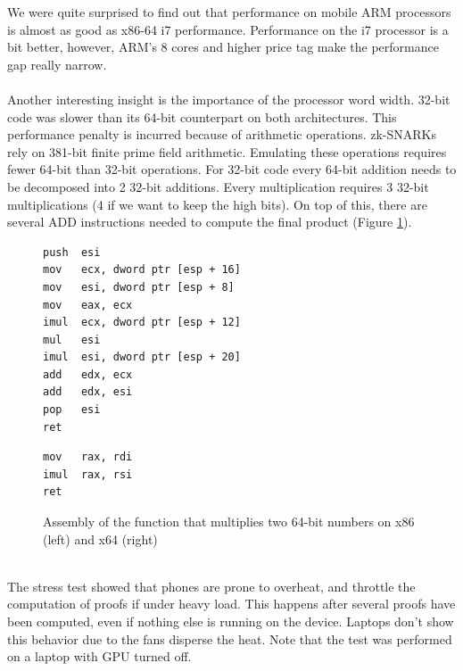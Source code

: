 We were quite surprised to find out that performance on mobile ARM processors is almost as good as x86-64 i7 performance. Performance on the i7 processor is a bit better, however, ARM's 8 cores and higher price tag make the performance gap really narrow.\\
\\
Another interesting insight is the importance of the processor word width. 32-bit code was slower than its 64-bit counterpart on both architectures. This performance penalty is incurred because of arithmetic operations. zk-SNARKs rely on 381-bit finite prime field arithmetic. Emulating these operations requires fewer 64-bit than 32-bit operations. For 32-bit code every 64-bit addition needs to be decomposed into 2 32-bit additions. Every multiplication requires 3 32-bit multiplications (4 if we want to keep the high bits). On top of this, there are several ADD instructions needed to compute the final product (Figure \ref{fig:mulcomp}).\\
\begin{figure}[h]
    \centering
    \begin{minipage}[t]{0.45\linewidth}
        \begin{lstlisting}[basicstyle=\small,language={[x86masm]Assembler}]
push  esi
mov   ecx, dword ptr [esp + 16]
mov   esi, dword ptr [esp + 8]
mov   eax, ecx
imul  ecx, dword ptr [esp + 12]
mul   esi
imul  esi, dword ptr [esp + 20]
add   edx, ecx
add   edx, esi
pop   esi
ret
        \end{lstlisting}
        \end{minipage}%
        \hfill\vrule\hfill
        \begin{minipage}[t]{0.45\linewidth}
        \begin{lstlisting}[basicstyle=\small,language={[x64]Assembler}]
mov   rax, rdi
imul  rax, rsi
ret
        \end{lstlisting}
        \end{minipage}

        \caption{Assembly of the function that multiplies two 64-bit numbers on x86 (left) and x64 (right)}
        \label{fig:mulcomp}
\end{figure}
\\
\noindent The stress test showed that phones are prone to overheat, and throttle the computation of proofs if under heavy load. This happens after several proofs have been computed, even if nothing else is running on the device. Laptops don't show this behavior due to the fans disperse the heat. Note that the test was performed on a laptop with GPU turned off.

